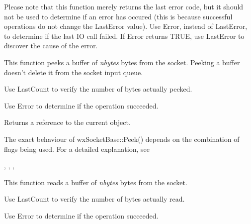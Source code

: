 Please note that this function merely returns the last error code,
but it should not be used to determine if an error has occured (this
is because successful operations do not change the LastError value).
Use Error, instead of LastError, to determine if the last IO call
failed. If Error returns TRUE, use LastError to discover the
cause of the error.

%
%
\label{wxsocketbasepeek}


This function peeks a buffer of {\it nbytes} bytes from the socket.
Peeking a buffer doesn't delete it from the socket input queue.

Use LastCount to verify the number of bytes actually peeked.

Use Error to determine if the operation succeeded.





Returns a reference to the current object.


The exact behaviour of wxSocketBase::Peek() depends on the combination
of flags being used. For a detailed explanation, see 


, 
, 
, 

%
%
\label{wxsocketbaseread}


This function reads a buffer of {\it nbytes} bytes from the socket.

Use LastCount to verify the number of bytes actually read.

Use Error to determine if the operation succeeded.

